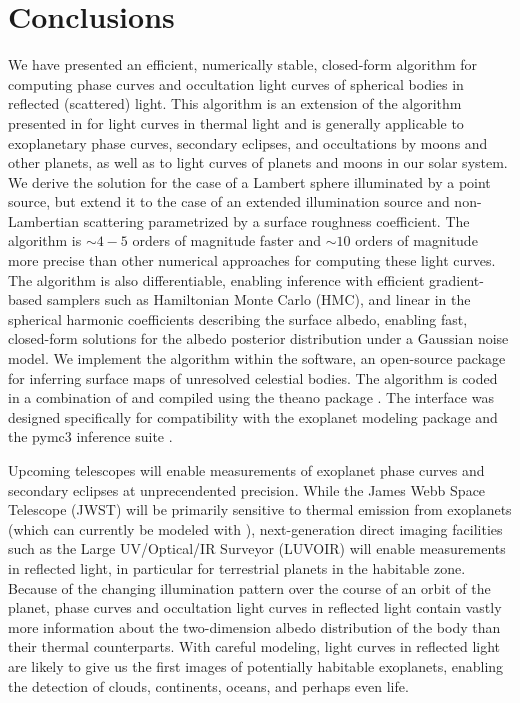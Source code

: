 \documentclass[modern]{aastex62}
\begin{document}
\section{Conclusions}
\label{sec:conclusions}

We have presented an efficient, numerically stable,
closed-form algorithm for computing phase curves
and occultation light curves of spherical bodies in reflected
(scattered) light.
This algorithm is an extension of the algorithm presented
in \citet{Luger2019} for light curves in thermal light and
is generally applicable to exoplanetary phase
curves, secondary eclipses, and occultations by moons and other planets,
as well as to light curves of planets and moons in our solar system.
We derive the solution for the case of a Lambert sphere illuminated by a
point source, but extend it to the case of an extended illumination
source and non-Lambertian scattering parametrized by a surface roughness
coefficient.
%
The algorithm is ${\sim}4-5$ orders of magnitude faster
and ${\sim}10$ orders of magnitude more precise than other numerical
approaches for computing these light curves. The algorithm is
also differentiable, enabling inference with efficient gradient-based samplers
such as Hamiltonian Monte Carlo (HMC), and linear in the spherical
harmonic coefficients describing the surface albedo, enabling fast,
closed-form solutions for the albedo posterior distribution under a
Gaussian noise model.
%
We implement the algorithm within the \starry software, an open-source \Python
package for inferring surface maps of unresolved celestial bodies. The
algorithm is coded in a combination of \cpp and \Python compiled using
the \textsf{theano} package \citep{theano}. The interface was designed specifically for
compatibility with the \textsf{exoplanet} modeling package
\citep{exoplanet} and the \textsf{pymc3} inference suite \citep{pymc3}.

Upcoming telescopes will enable measurements of exoplanet phase curves
and secondary eclipses at unprecendented precision. While the
James Webb Space Telescope (JWST) will be primarily sensitive to thermal
emission from exoplanets (which can currently be modeled with \starry),
next-generation direct imaging facilities such as the
Large UV/Optical/IR Surveyor (LUVOIR)
will enable measurements in reflected light, in particular for terrestrial
planets in the habitable zone. Because of the changing illumination
pattern over the course of an orbit of the planet, phase curves and
occultation light curves in reflected
light contain vastly more information about the two-dimension albedo
distribution of the body than their thermal counterparts.
With careful modeling, light curves in reflected light are likely to give us
the first images of potentially habitable exoplanets, enabling the
detection of clouds, continents, oceans, and perhaps even life.
\end{document}
